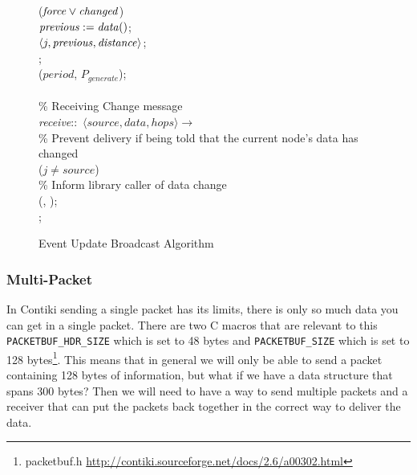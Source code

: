 \begin{figure}[H]
\begin{boxedminipage}{\linewidth}
    \null\qq\qq {} ($\mbox{\emph{force}} \lor \mbox{\emph{changed}}$) \\
    \null\qq\qq\qq $\mbox{\emph{previous}} \mathrel{:=} \mbox{\emph{data}}()$;\\
    \null\qq\qq\qq {}$\langle j, \mbox{\emph{previous}}, \mbox{\emph{distance}}\rangle$;\\
    \null\qq\qq {}; \\
    \null\qq\qq {}($\mathit{period}$, $P_{generate}$); \\~\\
    \null\qq \% Receiving Change message\\
    \null\qq \emph{receive}::~$\langle source, data, hops\rangle \rightarrow$\\
    \null\qq\qq \% Prevent delivery if being told that the current node's data has changed\\
    \null\qq\qq {} ($j \not= source$)  \\
    \null\qq\qq\qq \% Inform library caller of data change\\
    \null\qq\qq\qq {}(, ); \\
    \null\qq\qq {}; \\
  \end{boxedminipage}
  \caption{Event Update Broadcast Algorithm}
\end{figure}


\subsubsection{Multi-Packet}

In Contiki sending a single packet has its limits, there is only so much data you can get in a single packet. There are two C macros that are relevant to this \verb|PACKETBUF_HDR_SIZE| which is set to 48 bytes and \verb|PACKETBUF_SIZE| which is set to 128 bytes\footnote{packetbuf.h \url{http://contiki.sourceforge.net/docs/2.6/a00302.html}}. This means that in general we will only be able to send a packet containing 128 bytes of information, but what if we have a data structure that spans 300 bytes? Then we will need to have a way to send multiple packets and a receiver that can put the packets back together in the correct way to deliver the data.

